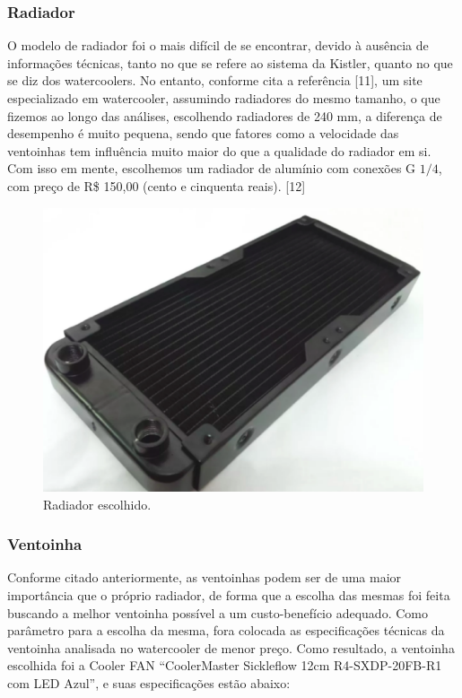\subsubsection{Radiador}

O modelo de radiador foi o mais difícil de se encontrar, devido à ausência de informações técnicas, tanto no que se refere ao sistema da Kistler, quanto no que se diz dos watercoolers. No entanto, conforme cita a referência [11], um site especializado em watercooler, assumindo radiadores do mesmo tamanho, o que fizemos ao longo das análises, escolhendo radiadores de 240 mm, a diferença de desempenho é muito pequena, sendo que fatores como a velocidade das ventoinhas tem influência muito maior do que a qualidade do radiador em si. Com isso em mente, escolhemos um radiador de alumínio com conexões G $1/4$, com preço de R\$ 150,00 (cento e cinquenta reais). [12]

\begin{figure}[!htb]                                                               
   \centering                                                                      
   \includegraphics[scale=0.4, keepaspectratio=true]{figuras/radiador.eps}
   \caption{Radiador escolhido.}               
\end{figure}

\newpage
\subsubsection{Ventoinha}

Conforme citado anteriormente, as ventoinhas podem ser de uma maior importância que o próprio radiador, de forma que a escolha das mesmas foi feita buscando a melhor ventoinha possível a um custo-benefício adequado. Como parâmetro para a escolha da mesma, fora colocada as especificações técnicas da ventoinha analisada no watercooler de menor preço. 
Como resultado, a ventoinha escolhida foi a Cooler FAN “CoolerMaster Sickleflow 12cm R4-SXDP-20FB-R1 com LED Azul”, e suas especificações estão abaixo:

